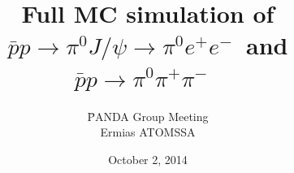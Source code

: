 \documentclass{beamer}
\begin{document}
\newcommand{\pnd}{\=PANDA }
\newcommand{\streama}{{\color{blue} Stream A~}}
\newcommand{\streamb}{{\color{red} Stream B~}}
\newcommand{\dm}{\mathrm{d}m}
\newcommand{\dpt}{\mathrm{d}p_T}
\newcommand{\pt}{p_T}
\newcommand{\tab}{\hspace{0.25cm}}

\newcommand{\pip}{{\normalsize$\pi^+$~}}
\newcommand{\pim}{{\normalsize$\pi^-$~}}
\newcommand{\pipm}{{\normalsize$\pi^{+}\pi^{-}$~}}
\newcommand{\epm}{{\normalsize$e^+e^-$}}
\newcommand{\piz}{{\normalsize$\pi^0$~}}
\newcommand{\jpsi}{{\normalsize$J/\psi$~}}
\newcommand{\jpsipbarp}{{\normalsize$J/\psi\rightarrow p\bar{p}$~}}

\newcommand{\pipT}{{\LARGE$\pi^+$~}}
\newcommand{\pimT}{{\LARGE$\pi^-$~}}
\newcommand{\pipmT}{{\LARGE$\pi^{+}\pi^{-}$~}}
\newcommand{\epmT}{{\LARGE$e^+e^-$}}
\newcommand{\pizT}{{\LARGE$\pi^0$~}}
\newcommand{\jpsiT}{{\LARGE$J/\psi$~}}
\newcommand{\jpsipbarpT}{{\LARGE$J/\psi\rightarrow p\bar{p}$~}}


\newcommand{\pintda}{$\pi$-N~TDA~}
\newcommand{\pintdas}{$\pi$-N~TDAs~}
\newcommand{\piantda}{$\pi$-$\bar{N}$~TDA~}
\newcommand{\piantdas}{$\pi$-$\bar{N}$~TDAs~}

\newcommand{\pizjpsi}{{\normalsize$\pi^0J/\psi$~}}
\newcommand{\pizpipm}{{\normalsize$\pi^0$\pipm}}
\newcommand{\pizjpsiT}{{\LARGE$\pi^0J/\psi$~}}
\newcommand{\pizpipmT}{{\LARGE$\pi^0$\pipmT}}

\newcommand{\sigrxn}{{\normalsize$\bar{p}p\rightarrow\pi^0J/\psi\rightarrow\pi^0e^+e^-$~}}
\newcommand{\sigrxnepem}{{\normalsize$\bar{p}p\rightarrow\pi^0\gamma^*\rightarrow\pi^0e^+e^-$~}}
\newcommand{\bgrxn}{{\normalsize$\bar{p}p\rightarrow\pi^0\pi^{+}\pi^{-}$~}}
\newcommand{\sigrxnT}{{\LARGE$\bar{p}p\rightarrow\pi^0J/\psi\rightarrow\pi^0e^+e^-$~}}
\newcommand{\sigrxnepemT}{{\LARGE$\bar{p}p\rightarrow\pi^0\gamma^*\rightarrow\pi^0e^+e^-$~}}
\newcommand{\bgrxnT}{{\LARGE$\bar{p}p\rightarrow\pi^0\pi^{+}\pi^{-}$~}}


\newcommand{\bgcut}{$-0.5<t[$GeV$^2]<0.6$, $2.96<M_{inv}[$GeV/c$^2] < 3.22$~}
\newcommand{\tcut}{$-0.5<t[$GeV$^2]<0.6$~}
\newcommand{\ucut}{$-0.5<u[$GeV$^2]<0.6$~}


\title[\pnd Group Meeting, TDA]{Full MC simulation of \sigrxn and \bgrxn}

\author[Ermias ATOMSSA]{\pnd Group Meeting\\ \vskip 0.5cm Ermias ATOMSSA}

\date[October 2, 2014]{October 2, 2014}
\end{document}
